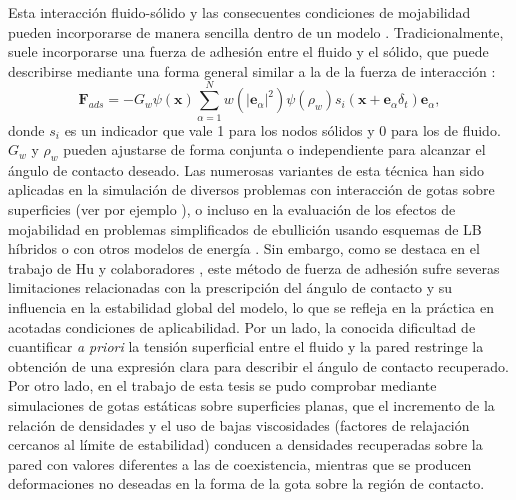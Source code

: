 Esta interacci\'on fluido-s\'olido y las consecuentes condiciones de mojabilidad pueden incorporarse de manera sencilla dentro de un modelo \pp{}. Tradicionalmente, suele incorporarse una fuerza de adhesi\'on entre el fluido y el s\'olido, que puede describirse mediante una forma general similar a la de la fuerza de interacci\'on \cite{chen_critical_2014}:
\begin{equation}
	\bm{F}_{ads}= -G_w \psi(\bm{x}) \sum_{\alpha=1}^{N} w(|\bm{e}_{\alpha}|^2)\psi(\rho_w) s_i(\bm{x}+\bm{e}_{\alpha}\delta_t)\bm{e}_{\alpha},
\end{equation}
donde $s_i$ es un indicador que vale 1 para los nodos s\'olidos y 0 para los de fluido. $G_w$ y $\rho_w$ pueden ajustarse de forma conjunta o independiente para alcanzar el \'angulo de contacto deseado. Las numerosas variantes de esta t\'ecnica han sido aplicadas en la simulaci\'on de diversos problemas con interacci\'on de gotas sobre superficies (ver por ejemplo \cite{xu_three-dimensional_2015,li_contact_2014, sbragaglia_surface_2006}), o incluso en la evaluaci\'on de los efectos de mojabilidad en problemas simplificados de ebullici\'on usando esquemas de LB h\'ibridos o con otros modelos de energ\'ia \cite{li_lattice_2016, ma_numerical_2019, guo_3d_2019}. Sin embargo, como se destaca en el trabajo de Hu y colaboradores \cite{hu_contact_2016}, este m\'etodo de fuerza de adhesi\'on sufre severas limitaciones relacionadas con la prescripci\'on del \'angulo de contacto y su influencia en la estabilidad global del modelo, lo que se refleja en la pr\'actica en acotadas condiciones de aplicabilidad. Por un lado, la conocida dificultad de cuantificar \emph{a priori} la tensi\'on superficial entre el fluido y la pared restringe la obtenci\'on de una expresi\'on clara para describir el \'angulo de contacto recuperado. Por otro lado, en el trabajo de esta tesis se pudo comprobar mediante simulaciones de gotas est\'aticas sobre superficies planas, que el incremento de la relaci\'on de densidades y el uso de bajas viscosidades (factores de relajaci\'on cercanos al l\'imite de estabilidad) conducen a densidades recuperadas sobre la pared con valores diferentes a las de coexistencia, mientras que se producen deformaciones no deseadas en la forma de la gota sobre la regi\'on de contacto.

